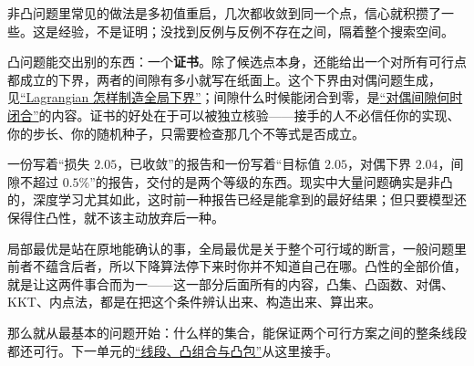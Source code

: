 非凸问题里常见的做法是多初值重启，几次都收敛到同一个点，信心就积攒了一些。这是经验，不是证明；没找到反例与反例不存在之间，隔着整个搜索空间。

凸问题能交出别的东西：一个\textbf{证书}。除了候选点本身，还能给出一个对所有可行点都成立的下界，两者的间隙有多小就写在纸面上。这个下界由对偶问题生成，见\hyperref[sec:09-Convex-Optimization/05-Duality/01]{``Lagrangian 怎样制造全局下界''}；间隙什么时候能闭合到零，是\hyperref[sec:09-Convex-Optimization/05-Duality/02]{``对偶间隙何时闭合''}的内容。证书的好处在于可以被独立核验——接手的人不必信任你的实现、你的步长、你的随机种子，只需要检查那几个不等式是否成立。

一份写着``损失 \(2.05\)，已收敛''的报告和一份写着``目标值 \(2.05\)，对偶下界 \(2.04\)，间隙不超过 \(0.5\%\)''的报告，交付的是两个等级的东西。现实中大量问题确实是非凸的，深度学习尤其如此，这时前一种报告已经是能拿到的最好结果；但只要模型还保得住凸性，就不该主动放弃后一种。

局部最优是站在原地能确认的事，全局最优是关于整个可行域的断言，一般问题里前者不蕴含后者，所以下降算法停下来时你并不知道自己在哪。凸性的全部价值，就是让这两件事合而为一——这一部分后面所有的内容，凸集、凸函数、对偶、KKT、内点法，都是在把这个条件辨认出来、构造出来、算出来。

那么就从最基本的问题开始：什么样的集合，能保证两个可行方案之间的整条线段都还可行。下一单元的\hyperref[sec:09-Convex-Optimization/02-Convex-Sets/01]{``线段、凸组合与凸包''}从这里接手。
